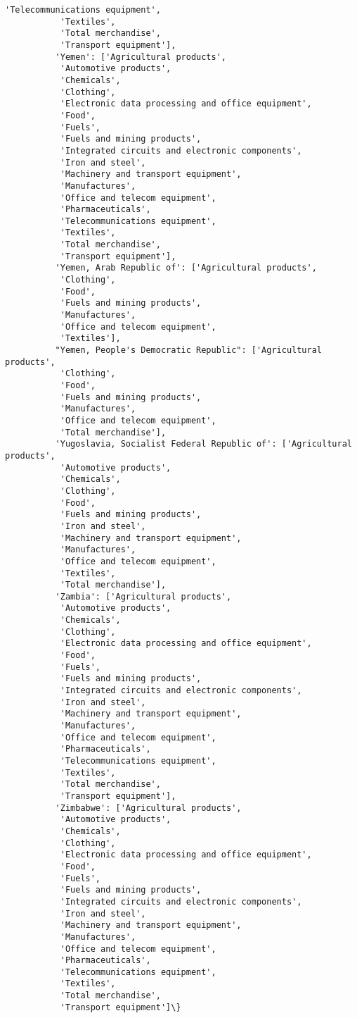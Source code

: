 \documentclass[11pt]{article}
\begin{document}
\begin{Verbatim}[commandchars=\\\{\}]
           'Telecommunications equipment',
           'Textiles',
           'Total merchandise',
           'Transport equipment'],
          'Yemen': ['Agricultural products',
           'Automotive products',
           'Chemicals',
           'Clothing',
           'Electronic data processing and office equipment',
           'Food',
           'Fuels',
           'Fuels and mining products',
           'Integrated circuits and electronic components',
           'Iron and steel',
           'Machinery and transport equipment',
           'Manufactures',
           'Office and telecom equipment',
           'Pharmaceuticals',
           'Telecommunications equipment',
           'Textiles',
           'Total merchandise',
           'Transport equipment'],
          'Yemen, Arab Republic of': ['Agricultural products',
           'Clothing',
           'Food',
           'Fuels and mining products',
           'Manufactures',
           'Office and telecom equipment',
           'Textiles'],
          "Yemen, People's Democratic Republic": ['Agricultural products',
           'Clothing',
           'Food',
           'Fuels and mining products',
           'Manufactures',
           'Office and telecom equipment',
           'Total merchandise'],
          'Yugoslavia, Socialist Federal Republic of': ['Agricultural products',
           'Automotive products',
           'Chemicals',
           'Clothing',
           'Food',
           'Fuels and mining products',
           'Iron and steel',
           'Machinery and transport equipment',
           'Manufactures',
           'Office and telecom equipment',
           'Textiles',
           'Total merchandise'],
          'Zambia': ['Agricultural products',
           'Automotive products',
           'Chemicals',
           'Clothing',
           'Electronic data processing and office equipment',
           'Food',
           'Fuels',
           'Fuels and mining products',
           'Integrated circuits and electronic components',
           'Iron and steel',
           'Machinery and transport equipment',
           'Manufactures',
           'Office and telecom equipment',
           'Pharmaceuticals',
           'Telecommunications equipment',
           'Textiles',
           'Total merchandise',
           'Transport equipment'],
          'Zimbabwe': ['Agricultural products',
           'Automotive products',
           'Chemicals',
           'Clothing',
           'Electronic data processing and office equipment',
           'Food',
           'Fuels',
           'Fuels and mining products',
           'Integrated circuits and electronic components',
           'Iron and steel',
           'Machinery and transport equipment',
           'Manufactures',
           'Office and telecom equipment',
           'Pharmaceuticals',
           'Telecommunications equipment',
           'Textiles',
           'Total merchandise',
           'Transport equipment']\}
\end{Verbatim}
            
\end{document}
